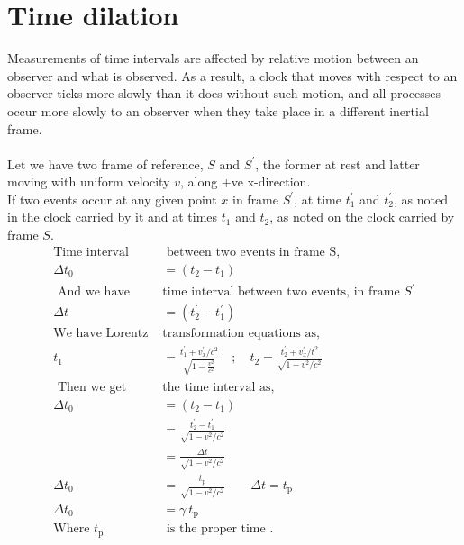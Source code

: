 \section{Time dilation}
Measurements of time intervals are affected by relative motion between an observer
and what is observed. As a result, a clock that moves with respect to an observer ticks
more slowly than it does without such motion, and all processes  occur more slowly to an observer when they take place in a different inertial frame.\\\\
Let we have two frame of reference, ${S}$ and ${S}^{\prime}$, the former at rest and latter moving with uniform velocity ${v}$, along +ve x-direction.\\
If two events occur at any given point $x$ in frame ${S}^{\prime}$, at time ${t}_{1}^{\prime}$ and $t_{2}^{\prime}$, as noted in the clock carried by it and
at times ${t}_{1}$ and ${t}_{2}$, as noted on the clock carried by frame ${S}$.
\begin{align*}
\text{Time interval}&\text{ between two events in frame S,}\\
\Delta t_{0}&=\left(t_{2}-t_{1}\right)\\
\text{ And we  have }&\text{time interval between two events, in frame ${S}^{\prime}$}\\
\Delta t&=\left(t_{2}^{\prime}-t_{1}^{\prime}\right)\\
\text{We have Lorentz }&\text{transformation equations as, }\\
t_{1}&=\frac{t_{1}^{\prime}+v_{x}^{\prime} / c^{2}}{\sqrt{1-\frac{v^{2}}{c^{2}}}} \quad ; \quad t_{2}=\frac{t_{2}^{\prime}+v_{x}^{\prime} / t^{2}}{\sqrt{1-v^{2} / c^{2}}}\\
\text{ Then we get }&\text{the time interval as,}\\
\Delta t_{0}&=\left(t_{2}-t_{1}\right)\\
&=\frac{t_{2}^{\prime}- t_{1}^{\prime}}{\sqrt{1-v^{2} / c^{2}}}\\
&=\frac{\Delta t}{\sqrt{1-v^{2} / c^{2}}}\\
\Delta t_{0}&=\frac{ t_{\text{p}}}{\sqrt{1-v^{2} / c^{2}}}\qquad \Delta t=t_{\text{p}}\\
\Delta t_{0}&=\gamma \ t_{\text{p}}\\
\text{Where $t_{\text{p}}$}&\text{ is the proper time .}
\end{align*}

